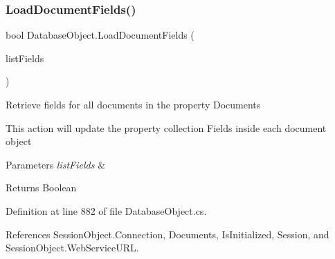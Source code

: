 \subsubsection{\texorpdfstring{Load\+Document\+Fields()}{LoadDocumentFields()}\hspace{0.1cm}{\footnotesize\ttfamily [2/2]}}
{\footnotesize\ttfamily bool Database\+Object.\+Load\+Document\+Fields (\begin{DoxyParamCaption}\item[{I\+List}]{list\+Fields }\end{DoxyParamCaption})}



Retrieve fields for all documents in the property \textquotesingle{}Documents\textquotesingle{} 

This action will update the property collection Fields inside each document object


\begin{DoxyParams}{Parameters}
{\em list\+Fields} & \\
\hline
\end{DoxyParams}
\begin{DoxyReturn}{Returns}
Boolean
\end{DoxyReturn}


Definition at line 882 of file Database\+Object.\+cs.



References Session\+Object.\+Connection, Documents, Is\+Initialized, Session, and Session\+Object.\+Web\+Service\+U\+RL.


